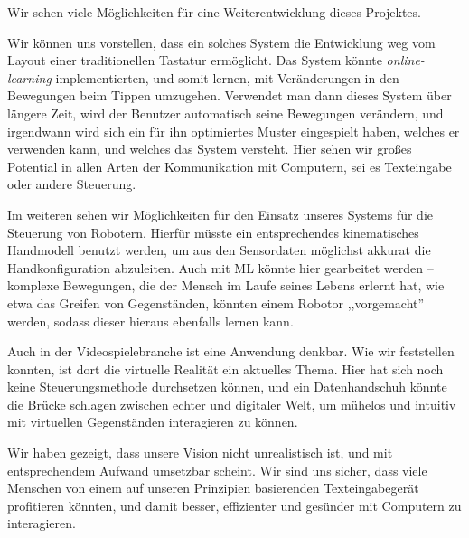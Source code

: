 Wir sehen viele Möglichkeiten für eine Weiterentwicklung dieses Projektes.

Wir können uns vorstellen, dass ein solches System die Entwicklung weg vom
Layout einer traditionellen Tastatur ermöglicht. Das System könnte
\emph{online-learning} implementierten, und somit lernen, mit Veränderungen in
den Bewegungen beim Tippen umzugehen. Verwendet man dann dieses System über
längere Zeit, wird der Benutzer automatisch seine Bewegungen verändern, und
irgendwann wird sich ein für ihn optimiertes Muster eingespielt haben, welches
er verwenden kann, und welches das System versteht. Hier sehen wir großes
Potential in allen Arten der Kommunikation mit Computern, sei es Texteingabe
oder andere Steuerung.

Im weiteren sehen wir Möglichkeiten für den Einsatz unseres Systems für die
Steuerung von Robotern. Hierfür müsste ein entsprechendes kinematisches
Handmodell benutzt werden, um aus den Sensordaten möglichst akkurat die
Handkonfiguration abzuleiten. Auch mit ML könnte hier gearbeitet werden --
komplexe Bewegungen, die der Mensch im Laufe seines Lebens erlernt hat, wie
etwa das Greifen von Gegenständen, könnten einem Robotor ,,vorgemacht'' werden,
sodass dieser hieraus ebenfalls lernen kann.

Auch in der Videospielebranche ist eine Anwendung denkbar. Wie wir feststellen
konnten, ist dort die virtuelle Realität ein aktuelles Thema. Hier hat sich noch
keine Steuerungsmethode durchsetzen können, und ein Datenhandschuh könnte die
Brücke schlagen zwischen echter und digitaler Welt, um mühelos und intuitiv mit
virtuellen Gegenständen interagieren zu können.

Wir haben gezeigt, dass unsere Vision nicht unrealistisch ist, und mit
entsprechendem Aufwand umsetzbar scheint. Wir sind uns sicher, dass viele
Menschen von einem auf unseren Prinzipien basierenden Texteingabegerät
profitieren könnten, und damit besser, effizienter und gesünder mit Computern
zu interagieren.
